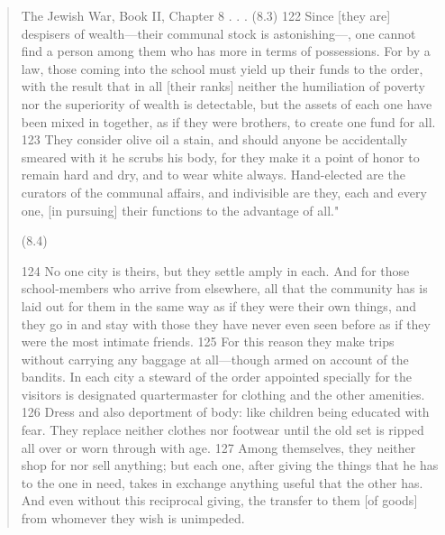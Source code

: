 \documentclass[11pt]{article}
\begin{document}
\begin{quote}
The Jewish War, Book II, Chapter 8
. . .
(8.3)
122 Since [they are] despisers of wealth—their communal stock is astonishing—, one cannot find a person among them who has more in terms of possessions. For by a law, those coming into the school must yield up their funds to the order, with the result that in all [their ranks] neither the humiliation of poverty nor the superiority of wealth is detectable, but the assets of each one have been mixed in together, as if they were brothers, to create one fund for all. 123 They consider olive oil a stain, and should anyone be accidentally smeared with it he scrubs his body, for they make it a point of honor to remain hard and dry, and to wear white always. Hand-elected are the curators of the communal affairs, and indivisible are they, each and every one, [in pursuing] their functions to the advantage of all."

(8.4)

124 No one city is theirs, but they settle amply in each. And for those school-members who arrive from elsewhere, all that the community has is laid out for them in the same way as if they were their own things, and they go in and stay with those they have never even seen before as if they were the most intimate friends. 125 For this reason they make trips without carrying any baggage at all—though armed on account of the bandits. In each city a steward of the order appointed specially for the visitors is designated quartermaster for clothing and the other amenities. 126 Dress and also deportment of body: like children being educated with fear. They replace neither clothes nor footwear until the old set is ripped all over or worn through with age. 127 Among themselves, they neither shop for nor sell anything; but each one, after giving the things that he has to the one in need, takes in exchange anything useful that the other has. And even without this reciprocal giving, the transfer to them [of goods] from whomever they wish is unimpeded.
\end{quote}
\cite{josephus on the essenes}
\end{document}
